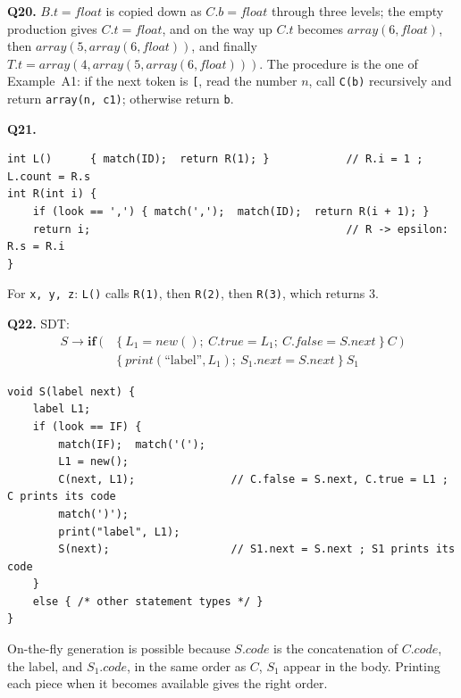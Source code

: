 \documentclass[11pt,a4paper]{article}
\newcommand{\at}[2]{\ensuremath{#1.\mathit{#2}}}
\newcommand{\tok}[1]{\ensuremath{\mathtt{#1}}}
\begin{document}
\textbf{Q20.} $B.t=\mathit{float}$ is copied down as $C.b=\mathit{float}$ through three levels; the empty production gives $C.t=\mathit{float}$, and on the way up $C.t$ becomes $\mathit{array}(6,\mathit{float})$, then $\mathit{array}(5,\mathit{array}(6,\mathit{float}))$, and finally $T.t=\mathit{array}(4,\mathit{array}(5,\mathit{array}(6,\mathit{float})))$. The procedure is the one of Example~A1: if the next token is \texttt{[}, read the number $n$, call \texttt{C(b)} recursively and return \texttt{array(n, c1)}; otherwise return \texttt{b}.

\textbf{Q21.}
\begin{lstlisting}
int L()      { match(ID);  return R(1); }            // R.i = 1 ;  L.count = R.s
int R(int i) {
    if (look == ',') { match(',');  match(ID);  return R(i + 1); }
    return i;                                        // R -> epsilon:  R.s = R.i
}
\end{lstlisting}
For \texttt{x, y, z}: \texttt{L()} calls \texttt{R(1)}, then \texttt{R(2)}, then \texttt{R(3)}, which returns 3.

\textbf{Q22.} SDT:
\begin{align*}
S \to \mathbf{if}\ \tok{(}\ &\{\ L_1=\mathit{new}();\ \at{C}{true}=L_1;\ \at{C}{false}=\at{S}{next}\ \}\ C\ \tok{)}\\
&\{\ \mathit{print}(\text{``label''},L_1);\ \at{S_1}{next}=\at{S}{next}\ \}\ S_1
\end{align*}
\begin{lstlisting}
void S(label next) {
    label L1;
    if (look == IF) {
        match(IF);  match('(');
        L1 = new();
        C(next, L1);               // C.false = S.next, C.true = L1 ; C prints its code
        match(')');
        print("label", L1);
        S(next);                   // S1.next = S.next ; S1 prints its code
    }
    else { /* other statement types */ }
}
\end{lstlisting}
On-the-fly generation is possible because $S.code$ is the concatenation of $C.code$, the label, and $S_1.code$, in the same order as $C$, $S_1$ appear in the body. Printing each piece when it becomes available gives the right order.
\end{document}
